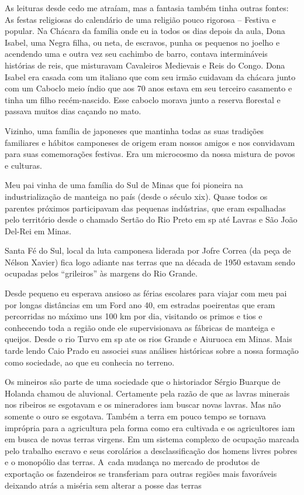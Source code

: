 As leituras desde cedo me atraíam, mas a fantasia também tinha outras
fontes: As festas religiosas do calendário de uma religião pouco
rigorosa -- Festiva e popular. Na Chácara da família onde eu ia todos os
dias depois da aula, Dona Isabel, uma Negra filha, ou neta, de escravos,
punha os pequenos no joelho e acendendo uma e outra vez seu cachimbo de
barro, contava intermináveis histórias de reis, que misturavam
Cavaleiros Medievais e Reis do Congo. Dona Isabel era casada com um
italiano que com seu irmão cuidavam da chácara junto com um Caboclo meio
índio que aos 70 anos estava em seu terceiro casamento e tinha um filho
recém-nascido. Esse caboclo morava junto a reserva florestal e passava
muitos dias caçando no mato.

Vizinho, uma família de japoneses que mantinha todas as suas tradições
familiares e hábitos camponeses de origem eram nossos amigos e nos
convidavam para suas comemorações festivas. Era um microcosmo da nossa
mistura de povos e culturas.

Meu pai vinha de uma família do Sul de Minas que foi pioneira na
industrialização de manteiga no país (desde o século {\sc xix}). Quase todos
os parentes próximos participavam das pequenas indústrias, que eram
espalhadas pelo território desde o chamado Sertão do Rio Preto em {\sc sp} até
Lavras e São João Del-Rei em Minas.

Santa Fé do Sul, local da luta camponesa liderada por Jofre Correa (da
peça de Nélson Xavier) fica logo adiante nas terras que na década de
1950 estavam sendo ocupadas pelos “grileiros” às margens do Rio Grande.

Desde pequeno eu esperava ansioso as férias escolares para viajar com
meu pai por longas distâncias em um Ford ano 40, em estradas poeirentas
que eram percorridas no máximo uns 100 km por dia, visitando os primos e
tios e conhecendo toda a região onde ele supervisionava as fábricas de
manteiga e queijos. Desde o rio Turvo em {\sc sp} ate os rios Grande e
Aiuruoca em Minas. Mais tarde lendo Caio Prado eu associei suas análises
históricas sobre a nossa formação como sociedade, ao que eu conhecia no
terreno.

Os mineiros são parte de uma sociedade que o historiador Sérgio Buarque
de Holanda chamou de aluvional. Certamente pela razão de que as lavras
minerais nos ribeiros se esgotavam e os mineradores iam buscar novas
lavras. Mas não somente o ouro se esgotava. Também a terra em pouco
tempo se tornava imprópria para a agricultura pela forma como era
cultivada e os agricultores iam em busca de novas terras virgens. Em um
sistema complexo de ocupação marcada pelo trabalho escravo e seus
corolários a desclassificação dos homens livres pobres e o monopólio das
terras. A~cada mudança no mercado de produtos de exportação os
fazendeiros se transferiam para outras regiões mais favoráveis deixando
atrás a miséria sem alterar a posse das terras

